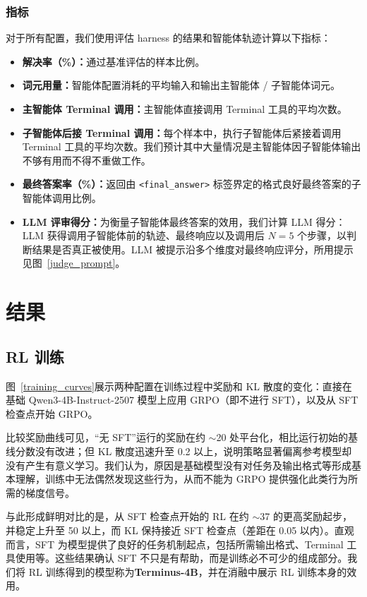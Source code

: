 \documentclass[sigconf,review]{acmart}
\begin{document}
\subsubsection{指标}
对于所有配置，我们使用评估 harness 的结果和智能体轨迹计算以下指标：
\begin{itemize}
    \item \textbf{解决率（\%）：}通过基准评估的样本比例。
    \item \textbf{词元用量：}智能体配置消耗的平均输入和输出主智能体 / 子智能体词元。
    \item \textbf{主智能体 Terminal 调用：}主智能体直接调用 Terminal 工具的平均次数。
    \item \textbf{子智能体后接 Terminal 调用：}每个样本中，执行子智能体后紧接着调用 Terminal 工具的平均次数。我们预计其中大量情况是主智能体因子智能体输出不够有用而不得不重做工作。
    \item \textbf{最终答案率（\%）：}返回由 \texttt{<final\_answer>} 标签界定的格式良好最终答案的子智能体调用比例。
    \item \textbf{LLM 评审得分：}为衡量子智能体最终答案的效用，我们计算 LLM 得分：LLM 获得调用子智能体前的轨迹、最终响应以及调用后 $N=5$ 个步骤，以判断结果是否真正被使用。LLM 被提示沿多个维度对最终响应评分，所用提示见图~\ref{judge_prompt}。
\end{itemize}

\section{结果}
\subsection{RL 训练}
图~\ref{training_curves}展示两种配置在训练过程中奖励和 KL 散度的变化：直接在基础 Qwen3-4B-Instruct-2507 模型上应用 GRPO（即不进行 SFT），以及从 SFT 检查点开始 GRPO。

比较奖励曲线可见，“无 SFT”运行的奖励在约 $\sim$20 处平台化，相比运行初始的基线分数没有改进；但 KL 散度迅速升至 0.2 以上，说明策略显著偏离参考模型却没有产生有意义学习。我们认为，原因是基础模型没有对任务及输出格式等形成基本理解，训练中无法偶然发现这些行为，从而不能为 GRPO 提供强化此类行为所需的梯度信号。

与此形成鲜明对比的是，从 SFT 检查点开始的 RL 在约 $\sim$37 的更高奖励起步，并稳定上升至 50 以上，而 KL 保持接近 SFT 检查点（差距在 0.05 以内）。直观而言，SFT 为模型提供了良好的任务机制起点，包括所需输出格式、Terminal 工具使用等。这些结果确认 SFT 不只是有帮助，而是训练必不可少的组成部分。我们将 RL 训练得到的模型称为\textbf{Terminus-4B}，并在消融中展示 RL 训练本身的效用。
\end{document}
